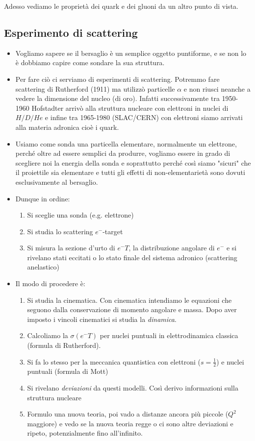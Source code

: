 Adesso vediamo le proprietà dei quark e dei gluoni da un altro punto di vista. 
\subsection{Esperimento di scattering}
\begin{itemize}
    \item Vogliamo sapere se il bersaglio è un semplice oggetto puntiforme, e se non lo è dobbiamo capire come sondare la sua struttura. 
    \item Per fare ciò ci serviamo di esperimenti di scattering. Potremmo fare scattering di Rutherford (1911) ma utilizzò particelle $\alpha$ e non riusci neanche a vedere la dimensione del nucleo (di oro). Infatti successivamente tra 1950-1960 Hofstadter arrivò alla struttura nucleare con elettroni in nuclei di $H/D/He$ e infine tra 1965-1980 (SLAC/CERN) con elettroni siamo arrivati alla materia adronica cioè i quark.
    \item Usiamo come sonda una particella elementare, normalmente un elettrone, perché oltre ad essere semplici da produrre, vogliamo essere in grado di scegliere noi la energia della sonda e soprattutto perché così siamo "sicuri" che il proiettile sia elementare e tutti gli effetti di non-elementarietà sono dovuti esclusivamente al bersaglio.
    \item Dunque in ordine:
    \begin{enumerate}
        \item Si sceglie una sonda (e.g. elettrone)
        \item Si studia lo scattering $e^-$-target 
        \item Si misura la sezione d'urto di $e^-T$, la distribuzione angolare di $e^-$ e si rivelano stati eccitati o lo stato finale del sistema adronico (scattering anelastico)
    \end{enumerate}
    \item Il modo di procedere è:
    \begin{enumerate}
        \item Si studia la cinematica. Con cinematica intendiamo le equazioni che seguono dalla conservazione di momento angolare e massa. Dopo aver imposto i vincoli cinematici si studia la \textit{dinamica}. 
        \item Calcoliamo la $\sigma(e^-T)$ per nuclei puntuali in elettrodinamica classica (formula di Rutherford).
        \item Si fa lo stesso per la meccanica quantistica con elettroni ($s=\frac12$) e nuclei puntuali (formula di Mott)
        \item Si rivelano \textit{deviazioni} da questi modelli. Così derivo informazioni sulla struttura nucleare
        \item Formulo una nuova teoria, poi vado a distanze ancora più piccole ($Q^2$ maggiore) e vedo se la nuova teoria regge o ci sono altre deviazioni e ripeto, potenzialmente fino all'infinito.
    \end{enumerate}
\end{itemize}
